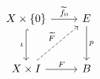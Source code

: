 \documentclass{article}
\begin{document}
    \begin{equation*}
        \begin{tikzcd}[row sep=0.4in]
            X\times\l\{0\r\} \ar[r, "\widetilde{f}_0"] \ar[d, "\iota"', hookrightarrow] & E \ar[d, "p"] \\
            X\times I \ar[r, "F"] \ar[ur, "\widetilde{F}", dashed] & B
        \end{tikzcd}
    \end{equation*}
\end{document}
